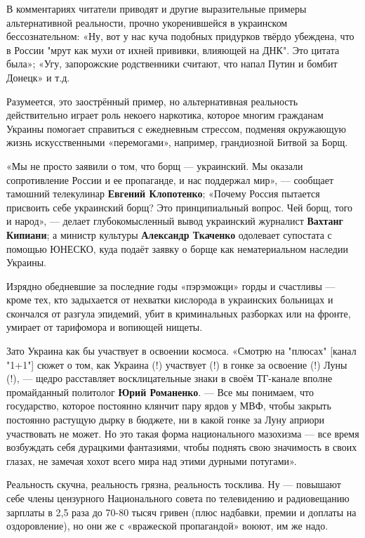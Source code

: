 В комментариях читатели приводят и другие выразительные примеры альтернативной
реальности, прочно укоренившейся в украинском бессознательном: «Ну, вот у нас
куча подобных придурков твёрдо убеждена, что в России "мрут как мухи от ихней
прививки, влияющей на ДНК". Это цитата была»; «Угу, запорожские родственники
считают, что напал Путин и бомбит Донецк» и т.д.

Разумеется, это заострённый пример, но альтернативная реальность действительно
играет роль некоего наркотика, которое многим гражданам Украины помогает
справиться с ежедневным стрессом, подменяя окружающую жизнь искусственными
«перемогами», например, грандиозной Битвой за Борщ.

«Мы не просто заявили о том, что борщ — украинский. Мы оказали сопротивление
России и ее пропаганде, и нас поддержал мир», — сообщает тамошний телекулинар
\textbf{Евгений Клопотенко}; «Почему Россия пытается присвоить себе украинский борщ? Это
принципиальный вопрос. Чей борщ, того и народ», — делает глубокомысленный вывод
украинский журналист \textbf{Вахтанг Кипиани}; а министр культуры \textbf{Александр Ткаченко}
одолевает супостата с помощью ЮНЕСКО, куда подаёт заявку о борще как
нематериальном наследии Украины.

Изрядно обедневшие за последние годы «пэрэможци» горды и счастливы — кроме тех,
кто задыхается от нехватки кислорода в украинских больницах и скончался от
разгула эпидемий, убит в криминальных разборках или на фронте, умирает от
тарифомора и вопиющей нищеты.

Зато Украина как бы участвует в освоении космоса. «Смотрю на "плюсах" [канал
"1+1"] сюжет о том, как Украина (!) участвует (!) в гонке за освоение (!) Луны
(!), — щедро расставляет восклицательные знаки в своём ТГ-канале вполне
промайданный политолог \textbf{Юрий Романенко}. — Все мы понимаем, что государство,
которое постоянно клянчит пару ярдов у МВФ, чтобы закрыть постоянно растущую
дырку в бюджете, ни в какой гонке за Луну априори участвовать не может. Но это
такая форма национального мазохизма — все время возбуждать себя дурацкими
фантазиями, чтобы поднять свою значимость в своих глазах, не замечая хохот
всего мира над этими дурными потугами».

Реальность скучна, реальность грязна, реальность тосклива. Ну — повышают себе
члены цензурного Национального совета по телевидению и радиовещанию зарплаты в
2,5 раза до 70-80 тысяч гривен (плюс надбавки, премии и доплаты на
оздоровление), но они же с «вражеской пропагандой» воюют, им же надо.

